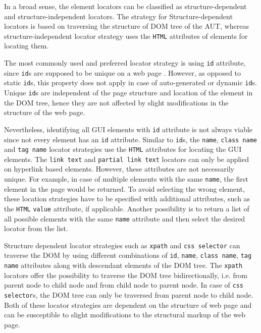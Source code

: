 In a broad sense, the element locators can be classified as structure-dependent and structure-independent locators. The strategy for Structure-dependent locators is based on traversing the structure of DOM tree of the AUT, whereas structure-independent locator strategy uses the \texttt{HTML} attributes of elements for locating them. 

The most commonly used and preferred locator strategy is using \texttt{id} attribute, since \texttt{id}s are supposed to be unique on a web page \cite{W3CIDs}. However, as opposed to static \texttt{id}s, this property does not apply in case of auto-generated or dynamic \texttt{id}s. Unique \texttt{id}s are independent of the page structure and location of the element in the DOM tree, hence they are not affected by slight modifications in the structure of the web page. 

Nevertheless, identifying all GUI elements with \texttt{id} attribute is not always viable since not every element has an \texttt{id} attribute. Similar to \texttt{id}s, the \texttt{name}, \texttt{class name} and \texttt{tag name} locator strategies use the \texttt{HTML} attributes for locating the GUI elements. 
The \texttt{link text} and  \texttt{partial link text} locators can only be applied on hyperlink based elements. However, these attributes are not necessarily unique. For example, in case of multiple elements with the same \texttt{name}, the first element in the page would be returned. To avoid selecting the wrong element, these location strategies have to be specified with additional attributes, such as the \texttt{HTML} \texttt{value} attribute, if applicable. Another possibility is to return a list of all possible elements with the same \texttt{name} attribute and then select the desired locator from the list. 

Structure dependent locator strategies such as \texttt{xpath} and \texttt{css selector} can traverse the DOM by using different combinations of \texttt{id}, \texttt{name}, \texttt{class name}, \texttt{tag name} attributes along with descendant elements of the DOM tree. The \texttt{xpath} locators offer the possibility to traverse the DOM tree bidirectionally, i.e. from parent node to child node and from child node to parent node. In case of \texttt{css selector}s, the DOM tree can only be traversed from parent node to child node. Both of these locator strategies are dependent on the structure of web page and can be susceptible to slight modifications to the structural markup of the web page.  
 
